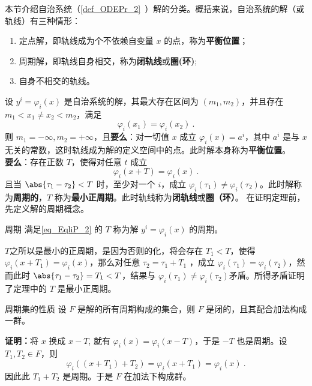 
本节介绍自治系统（\autoref{def_ODEPr_2}~）解的分类。概括来说，自治系统的解（或轨线）有三种情形：
\begin{enumerate}
\item 定点解，即轨线成为个不依赖自变量 $x$ 的点，称为\textbf{平衡位置}；
\item 周期解，即轨线自身相交，称为\textbf{闭轨线}或\textbf{圈(环)};
\item 自身不相交的轨线。
\end{enumerate}
\begin{theorem}{}\label{the_EqliP_1}
设 $y^i=\varphi_i(x)$ 是自治系统的解，其最大存在区间为 $(m_1,m_2)$，并且存在 $m_1<x_1\neq x_2<m_2$，满足
\begin{equation}\label{eq_EqliP_1}
\varphi_i(x_1)=\varphi_i(x_2)~.
\end{equation}
则 $m_1=-\infty,m_2=+\infty$，且\textbf{要么}：对一切值 $x$ 成立 $\varphi_i(x)=a^i$，其中 $a^i$ 是与 $x$ 无关的常数，这时轨线成为解的定义空间中的点。此时解本身称为\textbf{平衡位置}。\\
\textbf{要么}：存在正数 $T$，使得对任意 $t$ 成立
\begin{equation}\label{eq_EqliP_2}
\varphi_i(x+T)=\varphi_i(x)~.
\end{equation}
且当 $\abs{\tau_1-\tau_2}<T$ 时，至少对一个 $i$，成立 $\varphi_i(\tau_1)\neq\varphi_i(\tau_2)$。此时解称为\textbf{周期的}，$T$ 称为\textbf{最小正周期}。此时轨线称为\textbf{闭轨线}或\textbf{圈（环）}。
在证明定理前，先定义解的周期概念。
\end{theorem}
\begin{definition}{周期}
满足\autoref{eq_EqliP_2} 的 $T$ 称为解 $y^i=\varphi_i(x)$ 的周期。
\end{definition}
$T$之所以是最小的正周期，是因为否则的化，将会存在 $T_1<T$，使得 $\varphi_i(x+T_1)=\varphi_i(x)$，那么对任意 $\tau_2=\tau_1+T_1$ ，成立 $\varphi_i(\tau_1)=\varphi_i(\tau_2)$，然而此时 $\abs{\tau_1-\tau_2}=T_1<T$，结果与 $\varphi_i(\tau_1)\neq\varphi_i(\tau_2)$矛盾。所得矛盾证明了定理中的 $T$ 是最小正周期。

\begin{theorem}{周期集的性质}
设 $F$ 是解的所有周期构成的集合，则 $F$ 是闭的，且其配合加法构成一群。
\end{theorem}
\textbf{证明：}将 $x$ 换成 $x-T$, 就有 $\varphi_i(x)=\varphi_i(x-T)$，于是 $-T$ 也是周期。设 $T_1,T_2\in F$，则
\begin{equation}
\varphi_i((x+T_1)+T_2)=\varphi_i(x+T_1)=\varphi_i(x)~.
\end{equation}
因此此 $T_1+T_2$ 是周期。于是 $F$ 在加法下构成群。

